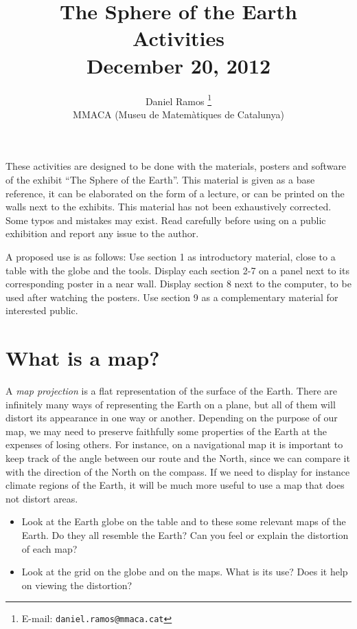 \documentclass[a4paper,12pt]{article}
\title{The Sphere of the Earth \\ Activities \\ {\small December 20, 2012  } }
\author{Daniel Ramos \footnote{E-mail: \texttt{daniel.ramos@mmaca.cat}}\\MMACA (Museu de Matemàtiques de Catalunya)}
\date{}
\begin{document}
\maketitle \thispagestyle{empty}


These activities are designed to be done with the materials, posters and software of the exhibit ``The Sphere of the Earth''. This material
is given as a base reference, it can be elaborated on the form of a lecture, or can be printed on the walls next to the exhibits. This
material has not been exhaustively corrected. Some typos and mistakes may exist. Read carefully before using on a public exhibition and
report any issue to the author.

\vspace{4em}
A proposed use is as follows: Use section 1 as introductory material, close to a table with the globe and the tools. Display each section
2-7 on a panel next to its corresponding poster in a near wall. Display section 8 next to the computer, to be used after watching the
posters. Use section 9 as a complementary material for interested public.




\newpage
\section{What is a map?}
A \emph{map projection} is a flat representation of the surface of the Earth. There are infinitely many ways of representing the Earth on a
plane, but all of them will distort its appearance in one way or another. Depending on the purpose of our map, we may need to preserve
faithfully some properties of the Earth at the expenses of losing others. For instance, on a navigational map it is important to keep track
of the angle between our route and the North, since we can compare it with the direction of the North on the compass. If we need to display
for instance climate regions of the Earth, it will be much more useful to use a map that does not distort areas.

\begin{itemize}
 \item Look at the Earth globe on the table and to these some relevant maps of the Earth. Do they all resemble the Earth? Can you feel or explain the distortion of each map?
 \item Look at the grid on the globe and on the maps. What is its use? Does it help on viewing the distortion?
\end{itemize}
\end{document}
